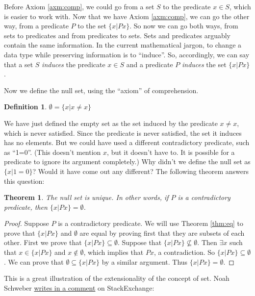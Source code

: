 \documentclass[12pt]{article}
\newcounter{dfnc}
\newcounter{thmc}
\newcounter{exc}
\newtheorem{dfn}[dfnc]{Definition}
\newtheorem{thm}[thmc]{Theorem}
\begin{document}
Before Axiom \ref{axm:comp}, we could go from a set $S$ to the
predicate $x\in S$, which is easier to work with.  Now that we have
Axiom \ref{axm:comp}, we can go the other way, from a predicate $P$ to
the set $\{x|Px\}$.  So now we can go both ways, from sets to
predicates and from predicates to sets.  Sets and predicates arguably
contain the same information.  In the current mathematical jargon, to
change a data type while preserving information is to ``induce''.  So,
accordingly, we can say that a set $S$ \textit{induces} the predicate
$x\in S$ and a predicate $P$ \textit{induces} the set $\{x|Px\}$.

Now we define the null set, using the ``axiom'' of comprehension.

\begin{dfn}
  $\emptyset=\{x|x\neq x\}$
\end{dfn}

We have just defined the empty set as the set induced by the predicate
$x\neq x$, which is never satisfied.  Since the predicate is never
satisfied, the set it induces has no elements.  But we could have used
a different contradictory predicate, such as ``1=0''. (This doesn't
mention $x$, but it doesn't have to.  It is possible for a predicate
to ignore its argument completely.)  Why didn't we define the null
set as $\{x|1=0\}$?  Would it have come out any different?  The
following theorem answers this question:

\begin{thm}
  The null set is unique.  In other words, if $P$ is a contradictory
  predicate, then $\{x|Px\}=\emptyset$.
\end{thm}

\begin{proof}
  Suppose $P$ is a contradictory predicate.  We will use Theorem
  \ref{thm:eq} to prove that $\{x|Px\}$ and $\emptyset$ are equal by
  proving first that they are subsets of each other.  First we prove
  that $\{x|Px\}\subseteq\emptyset$.  Suppose that
  $\{x|Px\}\not\subseteq\emptyset$.  Then $\exists x$ such that
  $x\in\{x|Px\}$ and $x\not\in\emptyset$, which implies that $Px$, a
  contradiction.  So $\{x|Px\}\subseteq\emptyset$.  We can prove that
  $\emptyset\subseteq\{x|Px\}$ by a similar argument.  Thus
  $\{x|Px\}=\emptyset$.
\end{proof}

This is a great illustration of the extensionality of the concept of
set.  Noah Schweber
\href{https://math.stackexchange.com/questions/2296639/is-the-empty-set-or-any-analogy-ever-non-unique#comment4724973_2296639}{writes
  in a comment} on StackExchange:
\end{document}
